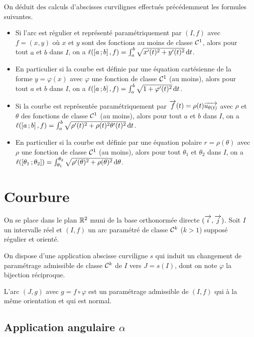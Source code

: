 On déduit des calculs d'abscisses curvilignes effectués précédemment les formules suivantes.
\begin{itemize}
\item Si l'arc est régulier et représenté paramétriquement par \((I, f)\) avec \(f=(x,y)\) où \(x\) et \(y\) sont des fonctions au moins de classe \(\mathcal{C}^{1}\), alors pour tout \(a\) et \(b\) dans \(I\), on a \(\ell(\left[ a \, ;  b \right],f)=\int_a^b\sqrt{x'(t)^2+y'(t)^2}\mathop{}\mathopen{}\mathrm{d} t\).
\item En particulier si la courbe est définie par une équation cartésienne de la forme \(y=\varphi(x)\) avec \(\varphi\) une fonction de classe \(\mathcal{C}^{1}\) (au moins), alors pour tout \(a\) et \(b\) dans \(I\), on a \(\ell(\left[ a \, ;  b \right],f)=\int_a^b\sqrt{1+\varphi'(t)^2}\mathop{}\mathopen{}\mathrm{d} t\).
\item Si la courbe est représentée paramétriquement par \(\overrightarrow{f}(t)=\rho(t)\overrightarrow{u_{\theta(t)}}\) avec \(\rho\) et \(\theta\) des fonctions de classe \(\mathcal{C}^{1}\) (au moins), alors pour tout \(a\) et \(b\) dans \(I\), on a \(\ell(\left[ a \, ;  b \right],f)=\int_a^b\sqrt{\rho'(t)^2+\rho(t)^2\theta'(t)^2}\mathop{}\mathopen{}\mathrm{d} t\).
\item En particulier si la courbe est définie par une équation polaire \(r=\rho(\theta)\) avec \(\rho\) une fonction de classe \(\mathcal{C}^{1}\) (au moins), alors pour tout \(\theta_1\) et \(\theta_2\) dans \(I\), on a \(\ell(\left[ \theta_1 \, ;  \theta_2 \right])=\int_{\theta_1}^{\theta_2}\sqrt{\rho'(\theta)^2+\rho(\theta)^2}\mathop{}\mathopen{}\mathrm{d} \theta\).
\end{itemize}

\section{Courbure}

On se place dans le plan \(\mathbb{R}^2\) muni de la base orthonormée directe \((\overrightarrow{i}, \overrightarrow{j})\). Soit \(I\) un intervalle réel et \((I,f)\) un arc paramétré de classe \(\mathcal{C}^{k}\) (\(k>1\)) supposé régulier et orienté. 

On dispose d'une application abscisse curviligne \(s\) qui induit un changement de paramétrage admissible de classe \(\mathcal{C}^{k}\) de \(I\) vers \(J=s(I)\), dont on note \(\varphi\) la bijection réciproque.

L'arc \((J, g)\) avec \(g=f \circ \varphi\) est un paramétrage admissible de \((I,f)\) qui à la même orientation et qui est normal.

\subsection{Application angulaire \(\alpha\)}

